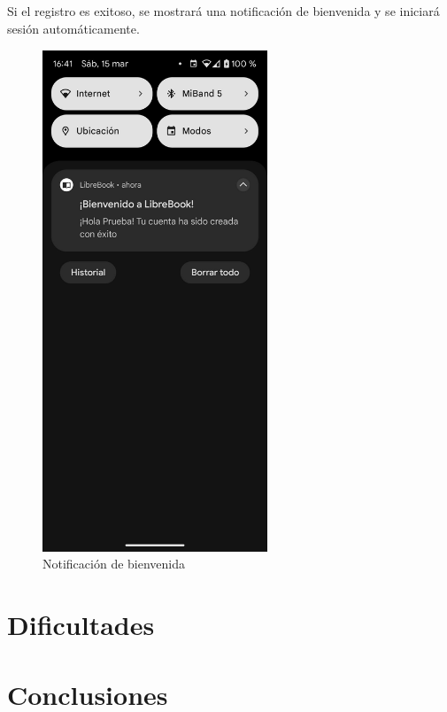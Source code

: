 \documentclass[a4paper,12pt]{report}
\begin{document}
      \vspace{1cm}
      \begin{minipage}{0.6\textwidth}
        \paragraph*{}{
          Si el registro es exitoso, se mostrará una notificación de bienvenida y se iniciará sesión automáticamente.
        }
      \end{minipage}
      \hfill
      \begin{minipage}{0.4\textwidth}
        \begin{figure}[H]
          \centering
          \includegraphics[width=0.6\textwidth]{.img/registro-noti.png}
          \caption{Notificación de bienvenida}
          \label{fig:notificacion-registro}
        \end{figure}
      \end{minipage}
  \chapter{Dificultades}
  \chapter{Conclusiones}
\end{document}
